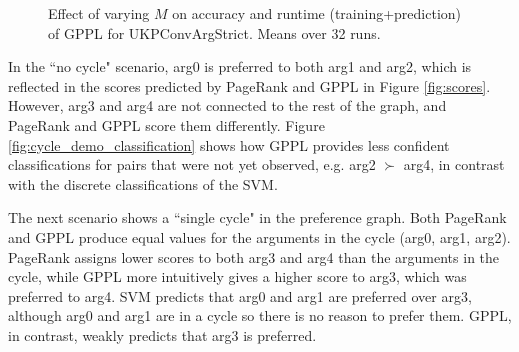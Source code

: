\begin{figure}[t]
\caption{Effect of varying $M$ on accuracy and runtime (training+prediction) of GPPL for UKPConvArgStrict.  Means over 32 runs.}
\label{fig:scale_M}
\end{figure}
In the  ``no cycle" scenario, 
arg0 is preferred to both arg1 and arg2, which is reflected in the scores predicted by PageRank and GPPL in Figure \ref{fig:scores}. However, arg3 and arg4 are not connected to the rest of the graph, and PageRank and GPPL score them differently. 
Figure \ref{fig:cycle_demo_classification} shows how GPPL provides less confident classifications for pairs that were not yet observed, e.g. arg2 $\succ$ arg4, in contrast with the discrete classifications of the SVM.

The next scenario shows a ``single cycle" in the preference graph.
Both PageRank and GPPL produce equal values for the arguments in the cycle (arg0, arg1, arg2). PageRank assigns lower scores to both arg3 and arg4 than the arguments in the cycle, 
while GPPL more intuitively gives a higher score to arg3, which was preferred to arg4. 
SVM predicts that arg0 and arg1 are preferred over arg3, 
although arg0 and arg1 are in a cycle so there is no reason to prefer them. 
GPPL, in contrast,  weakly predicts that arg3 is preferred.


